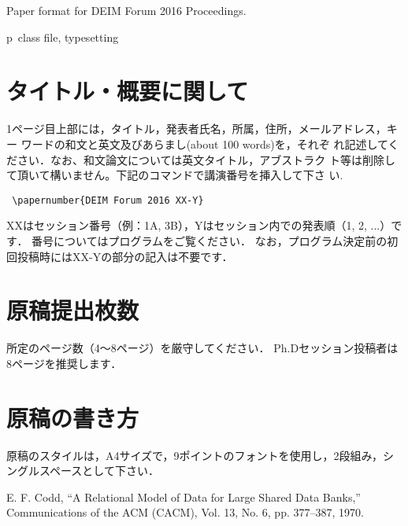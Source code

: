 \documentclass{deime}
\begin{document}
\pagestyle{empty}
\begin{eabstract}
Paper format for DEIM Forum 2016 Proceedings.
\end{eabstract}
\begin{ekeyword}
p\LaTeXe\ class file, typesetting
\end{ekeyword}
\maketitle

\section{タイトル・概要に関して}

1ページ目上部には，タイトル，発表者氏名，所属，住所，メールアドレス，キー
ワードの和文と英文及びあらまし(about 100 words)を，それぞ
れ記述してください．なお、和文論文については英文タイトル，アブストラク
ト等は削除して頂いて構いません。下記のコマンドで講演番号を挿入して下さ
い.
\begin{verbatim}
 \papernumber{DEIM Forum 2016 XX-Y}
\end{verbatim}
XXはセッション番号（例：1A, 3B），Yはセッション内での発表順（1, 2, ...）です．
番号についてはプログラムをご覧ください．
なお，プログラム決定前の初回投稿時にはXX-Yの部分の記入は不要です．

\section{原稿提出枚数}

所定のページ数（4～8ページ）を厳守してください．
Ph.Dセッション投稿者は8ページを推奨します．

\section{原稿の書き方}

原稿のスタイルは，A4サイズで，9ポイントのフォントを使用し，2段組み，シングルスペースとして下さい．

\vspace{5em}

\begin{thebibliography}{99}
  E. F. Codd, 
  ``A Relational Model of Data for Large Shared Data Banks,''
  Communications of the {ACM} (CACM), Vol. 13, No. 6, pp. 377--387, 1970.
\end{thebibliography}
\end{document}
